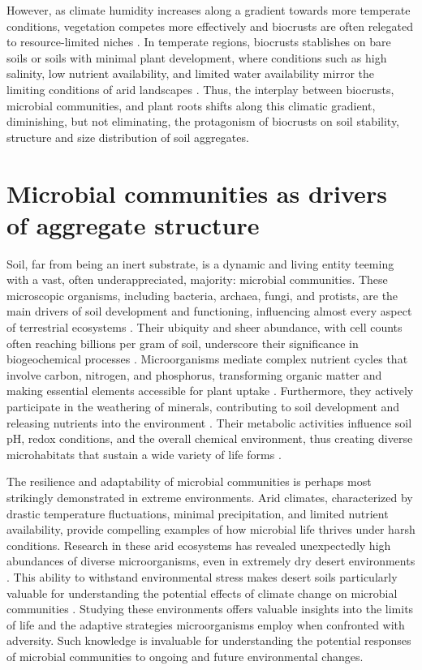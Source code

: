 However, as climate humidity increases along a gradient towards more temperate conditions, vegetation competes more effectively and biocrusts are often relegated to resource-limited niches \citep{Büdel2016}. In temperate regions, biocrusts stablishes on bare soils or soils with minimal plant development, where conditions such as high salinity, low nutrient availability, and limited water availability mirror the limiting conditions of arid landscapes \citep{Corbin2020}. Thus, the interplay between biocrusts, microbial communities, and plant roots shifts along this climatic gradient, diminishing, but not eliminating, the protagonism of biocrusts on soil stability, structure and size distribution of soil aggregates.

\section{Microbial communities as drivers of aggregate structure}
\label{sec:MicrobialCommunitiesAggregateStructure}

Soil, far from being an inert substrate, is a dynamic and living entity teeming with a vast, often underappreciated, majority: microbial communities. These microscopic organisms, including bacteria, archaea, fungi, and protists, are the main drivers of soil development and functioning, influencing almost every aspect of terrestrial ecosystems \citep{Bardgett2014}. Their ubiquity and sheer abundance, with cell counts often reaching billions per gram of soil, underscore their significance in biogeochemical processes \citep{Nunan2001}. Microorganisms mediate complex nutrient cycles that involve carbon, nitrogen, and phosphorus, transforming organic matter and making essential elements accessible for plant uptake \citep{Schimel2012}. Furthermore, they actively participate in the weathering of minerals, contributing to soil development and releasing nutrients into the environment \citep{Barkay2001,Burford2003}. Their metabolic activities influence soil pH, redox conditions, and the overall chemical environment, thus creating diverse microhabitats that sustain a wide variety of life forms \citep{Brehm2005}.

The resilience and adaptability of microbial communities is perhaps most strikingly demonstrated in extreme environments. Arid climates, characterized by drastic temperature fluctuations, minimal precipitation, and limited nutrient availability, provide compelling examples of how microbial life thrives under harsh conditions. Research in these arid ecosystems has revealed unexpectedly high abundances of diverse microorganisms, even in extremely dry desert environments \citep{Bernhard2018,Newsham2016}. This ability to withstand environmental stress makes desert soils particularly valuable for understanding the potential effects of climate change on microbial communities \citep{Pearce2012}. Studying these environments offers valuable insights into the limits of life and the adaptive strategies microorganisms employ when confronted with adversity. Such knowledge is invaluable for understanding the potential responses of microbial communities to ongoing and future environmental changes.

